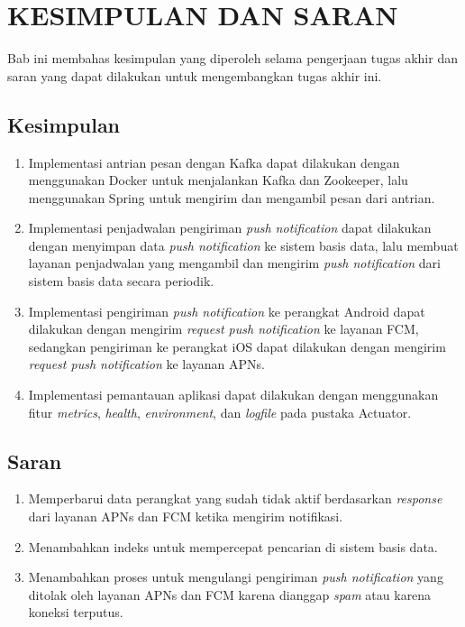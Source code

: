 \chapter{KESIMPULAN DAN SARAN}
\par Bab ini membahas kesimpulan yang diperoleh selama pengerjaan tugas akhir dan saran yang dapat dilakukan untuk mengembangkan tugas akhir ini.

\section{Kesimpulan}
\begin{enumerate}
	\item Implementasi antrian pesan dengan Kafka dapat dilakukan dengan menggunakan Docker untuk menjalankan Kafka dan Zookeeper, lalu menggunakan Spring untuk mengirim dan mengambil pesan dari antrian.
	\item Implementasi penjadwalan pengiriman \textit{push notification} dapat dilakukan dengan menyimpan data \textit{push notification} ke sistem basis data, lalu membuat layanan penjadwalan yang mengambil dan mengirim \textit{push notification} dari sistem basis data secara periodik.
	\item Implementasi pengiriman \textit{push notification} ke perangkat Android dapat dilakukan dengan mengirim \textit{request push notification} ke layanan FCM, sedangkan pengiriman ke perangkat iOS dapat dilakukan dengan mengirim \textit{request push notification} ke layanan APNs.
	\item Implementasi pemantauan aplikasi dapat dilakukan dengan menggunakan fitur \textit{metrics}, \textit{health}, \textit{environment}, dan \textit{logfile} pada pustaka Actuator.
\end{enumerate}

\section{Saran}
\begin{enumerate}
    \item Memperbarui data perangkat yang sudah tidak aktif berdasarkan \textit{response} dari layanan APNs dan FCM ketika mengirim notifikasi.
    \item Menambahkan indeks untuk mempercepat pencarian di sistem basis data.
    \item Menambahkan proses untuk mengulangi pengiriman \textit{push notification} yang ditolak oleh layanan APNs dan FCM karena dianggap \textit{spam} atau karena koneksi terputus.
\end{enumerate}
